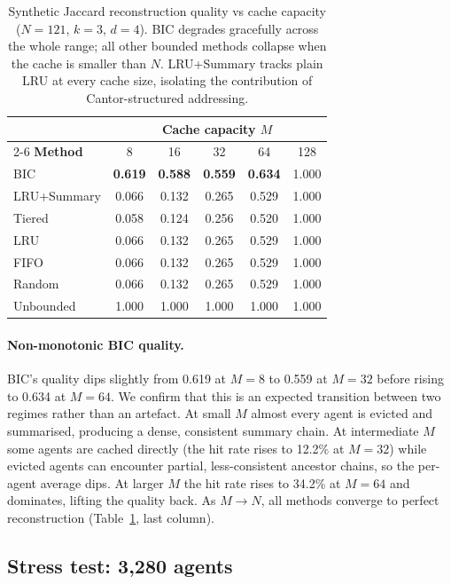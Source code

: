 \documentclass[fleqn,10pt]{article}
\theoremstyle{definition}
\newcommand{\slots}{M}
\begin{document}
\begin{table}[t]
\centering
\caption{Synthetic Jaccard reconstruction quality vs cache capacity
($N{=}121$, $k{=}3$, $d{=}4$). BIC degrades gracefully across the
whole range; all other bounded methods collapse when the cache is
smaller than $N$. LRU+Summary tracks plain LRU at every cache size,
isolating the contribution of Cantor-structured addressing.
\label{tab:quality-cache}}
\begin{tabular}{lccccc}
\toprule
& \multicolumn{5}{c}{\textbf{Cache capacity $\slots$}} \\
\cmidrule(l){2-6}
\textbf{Method} & 8 & 16 & 32 & 64 & 128 \\
\midrule
BIC         & \textbf{0.619} & \textbf{0.588} & \textbf{0.559} & \textbf{0.634} & 1.000 \\
LRU+Summary & 0.066 & 0.132 & 0.265 & 0.529 & 1.000 \\
Tiered      & 0.058 & 0.124 & 0.256 & 0.520 & 1.000 \\
LRU         & 0.066 & 0.132 & 0.265 & 0.529 & 1.000 \\
FIFO        & 0.066 & 0.132 & 0.265 & 0.529 & 1.000 \\
Random      & 0.066 & 0.132 & 0.265 & 0.529 & 1.000 \\
Unbounded   & 1.000 & 1.000 & 1.000 & 1.000 & 1.000 \\
\bottomrule
\end{tabular}
\end{table}

\paragraph{Non-monotonic BIC quality.}
BIC's quality dips slightly from 0.619 at $\slots{=}8$ to 0.559 at
$\slots{=}32$ before rising to 0.634 at $\slots{=}64$. We confirm
that this is an expected transition between two regimes rather than
an artefact. At small $\slots$ almost every agent is evicted and
summarised, producing a dense, consistent summary chain. At
intermediate $\slots$ some agents are cached directly (the hit rate
rises to 12.2\% at $\slots{=}32$) while evicted agents can encounter
partial, less-consistent ancestor chains, so the per-agent average
dips. At larger $\slots$ the hit rate rises to 34.2\% at
$\slots{=}64$ and dominates, lifting the quality back. As
$\slots \to N$, all methods converge to perfect reconstruction
(Table~\ref{tab:quality-cache}, last column).

\subsection*{Stress test: 3,280 agents}
\end{document}
